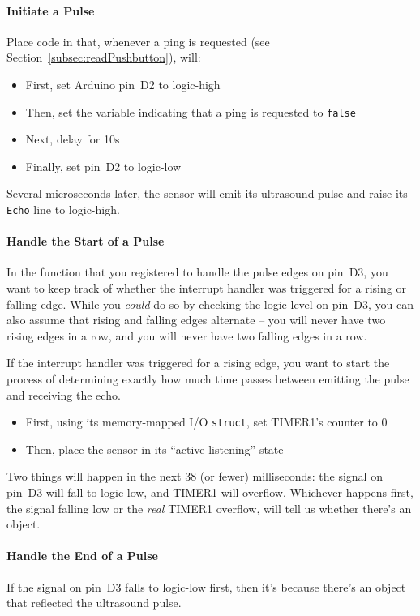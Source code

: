 \paragraph{Initiate a Pulse}
Place code in  that, whenever a ping is requested (see Section~\ref{subsec:readPushbutton}), will:
\begin{itemize}
    \item First, set Arduino pin~D2 to logic-high
    \item Then, set the variable indicating that a ping is requested to \lstinline{false}
    \item Next, delay for 10\textmu s
    \item Finally, set pin~D2 to logic-low
\end{itemize}

Several microseconds later, the sensor will emit its ultrasound pulse and raise its \texttt{Echo} line to logic-high.

\paragraph{Handle the Start of a Pulse}
In the function that you registered to handle the pulse edges on pin~D3, you want to keep track of whether the interrupt handler was triggered for a rising or falling edge.
While you \textit{could} do so by checking the logic level on pin~D3, you can also assume that rising and falling edges alternate --
you will never have two rising edges in a row, and you will never have two falling edges in a row.

If the interrupt handler was triggered for a rising edge, you want to start the process of determining exactly how much time passes between emitting the pulse and receiving the echo.
\begin{itemize}
    \item First, using its memory-mapped I/O \lstinline{struct}, set TIMER1's counter to 0
    \item Then, place the sensor in its ``active-listening'' state
\end{itemize}

Two things will happen in the next 38 (or fewer) milliseconds: the signal on pin~D3 will fall to logic-low, and TIMER1 will overflow.
Whichever happens first, the signal falling low or the \textit{real} TIMER1 overflow, will tell us whether there's an object.

\paragraph{Handle the End of a Pulse}
If the signal on pin~D3 falls to logic-low first, then it's because there's an object that reflected the ultrasound pulse.

